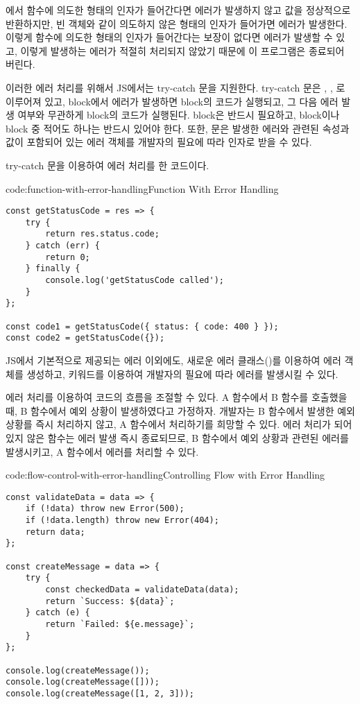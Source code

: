 에서  함수에 의도한 형태의 인자가 들어간다면 에러가 발생하지 않고 값을 정상적으로 반환하지만, 빈 객체와 같이 의도하지 않은 형태의 인자가 들어가면 에러가 발생한다. 이렇게 함수에 의도한 형태의 인자가 들어간다는 보장이 없다면 에러가 발생할 수 있고, 이렇게 발생하는 에러가 적절히 처리되지 않았기 때문에 이 프로그램은 종료되어 버린다.

이러한 에러 처리를 위해서 JS에서는 try-catch 문을 지원한다. try-catch 문은 , , 로 이루어져 있고,  block에서 에러가 발생하면  block의 코드가 실행되고, 그 다음 에러 발생 여부와 무관하게  block의 코드가 실행된다.  block은 반드시 필요하고,  block이나  block 중 적어도 하나는 반드시 있어야 한다. 또한,  문은 발생한 에러와 관련된 속성과 값이 포함되어 있는 에러 객체를 개발자의 필요에 따라 인자로 받을 수 있다.

\은 try-catch 문을 이용하여 에러 처리를 한 코드이다.

\begin{codeenv}{code:function-with-error-handling}{Function With Error Handling}\begin{verbatim}
const getStatusCode = res => {
    try {
        return res.status.code;
    } catch (err) {
        return 0;
    } finally {
        console.log('getStatusCode called');
    }
};

const code1 = getStatusCode({ status: { code: 400 } });
const code2 = getStatusCode({});
\end{verbatim}
\end{codeenv}

JS에서 기본적으로 제공되는 에러 이외에도, 새로운 에러 클래스()를 이용하여 에러 객체를 생성하고,  키워드를 이용하여 개발자의 필요에 따라 에러를 발생시킬 수 있다.

에러 처리를 이용하여 코드의 흐름을 조절할 수 있다. A 함수에서 B 함수를 호출했을 때, B 함수에서 예외 상황이 발생하였다고 가정하자. 개발자는 B 함수에서 발생한 예외 상황를 즉시 처리하지 않고, A 함수에서 처리하기를 희망할 수 있다. 에러 처리가 되어있지 않은 함수는 에러 발생 즉시 종료되므로, B 함수에서 예외 상황과 관련된 에러를 발생시키고, A 함수에서 에러를 처리할 수 있다.

\begin{codeenv}{code:flow-control-with-error-handling}{Controlling Flow with Error Handling}\begin{verbatim}
const validateData = data => {
    if (!data) throw new Error(500);
    if (!data.length) throw new Error(404);
    return data;
};

const createMessage = data => {
    try {
        const checkedData = validateData(data);
        return `Success: ${data}`;
    } catch (e) {
        return `Failed: ${e.message}`;
    }
};

console.log(createMessage());
console.log(createMessage([]));
console.log(createMessage([1, 2, 3]));
\end{verbatim}
\end{codeenv}


